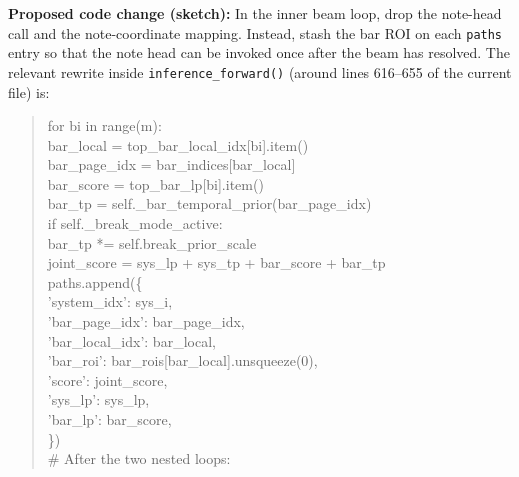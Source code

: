\documentclass{article}
\begin{document}
\textbf{Proposed code change (sketch):}
In the inner beam loop, drop the note-head call and the note-coordinate mapping. Instead, stash the bar ROI on each \texttt{paths} entry so that the note head can be invoked once after the beam has resolved. The relevant rewrite inside \texttt{inference\_forward()} (around lines 616--655 of the current file) is:
\begin{quote}\small\ttfamily
for bi in range(m):\\
\hspace*{1em}bar\_local = top\_bar\_local\_idx[bi].item()\\
\hspace*{1em}bar\_page\_idx = bar\_indices[bar\_local]\\
\hspace*{1em}bar\_score = top\_bar\_lp[bi].item()\\
\hspace*{1em}bar\_tp = self.\_bar\_temporal\_prior(bar\_page\_idx)\\
\hspace*{1em}if self.\_break\_mode\_active:\\
\hspace*{2em}bar\_tp *= self.break\_prior\_scale\\[4pt]
\hspace*{1em}joint\_score = sys\_lp + sys\_tp + bar\_score + bar\_tp\\[4pt]
\hspace*{1em}paths.append(\{\\
\hspace*{2em}'system\_idx': sys\_i,\\
\hspace*{2em}'bar\_page\_idx': bar\_page\_idx,\\
\hspace*{2em}'bar\_local\_idx': bar\_local,\\
\hspace*{2em}'bar\_roi': bar\_rois[bar\_local].unsqueeze(0),\\
\hspace*{2em}'score': joint\_score,\\
\hspace*{2em}'sys\_lp': sys\_lp,\\
\hspace*{2em}'bar\_lp': bar\_score,\\
\hspace*{1em}\})\\[6pt]
\# After the two nested loops:\\

\end{quote}
\end{document}
